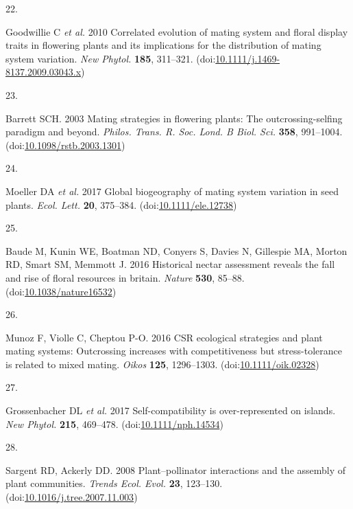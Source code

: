 \documentclass[
  12pt,
  a4paper,
]{article}
\newlength{\cslhangindent}
\newlength{\csllabelwidth}
\newlength{\cslentryspacingunit} %
\newenvironment{CSLReferences}[2] %
 {%
  \setlength{\parindent}{0pt}
  \ifodd #1
  \let\oldpar\par
  \def\par{\hangindent=\cslhangindent\oldpar}
  \fi
  \setlength{\parskip}{#2\cslentryspacingunit}
 }%
 {}
\newcommand{\CSLLeftMargin}[1]{\parbox[t]{\csllabelwidth}{#1}}
\newcommand{\CSLRightInline}[1]{\parbox[t]{\linewidth - \csllabelwidth}{#1}\break}
\begin{document}
\begin{CSLReferences}{0}{0}
\leavevmode{}%
\CSLLeftMargin{22. }
\CSLRightInline{Goodwillie C \emph{et al.} 2010 Correlated evolution of mating system and floral display traits in flowering plants and its implications for the distribution of mating system variation. \emph{New Phytol.} \textbf{185}, 311--321. (doi:\href{https://doi.org/10.1111/j.1469-8137.2009.03043.x}{10.1111/j.1469-8137.2009.03043.x})}

\leavevmode{}%
\CSLLeftMargin{23. }
\CSLRightInline{Barrett SCH. 2003 Mating strategies in flowering plants: The outcrossing-selfing paradigm and beyond. \emph{Philos. Trans. R. Soc. Lond. B Biol. Sci.} \textbf{358}, 991--1004. (doi:\href{https://doi.org/10.1098/rstb.2003.1301}{10.1098/rstb.2003.1301})}

\leavevmode{}%
\CSLLeftMargin{24. }
\CSLRightInline{Moeller DA \emph{et al.} 2017 Global biogeography of mating system variation in seed plants. \emph{Ecol. Lett.} \textbf{20}, 375--384. (doi:\href{https://doi.org/10.1111/ele.12738}{10.1111/ele.12738})}

\leavevmode{}%
\CSLLeftMargin{25. }
\CSLRightInline{Baude M, Kunin WE, Boatman ND, Conyers S, Davies N, Gillespie MA, Morton RD, Smart SM, Memmott J. 2016 Historical nectar assessment reveals the fall and rise of floral resources in britain. \emph{Nature} \textbf{530}, 85--88. (doi:\href{https://doi.org/10.1038/nature16532}{10.1038/nature16532})}

\leavevmode{}%
\CSLLeftMargin{26. }
\CSLRightInline{Munoz F, Violle C, Cheptou P-O. 2016 {CSR} ecological strategies and plant mating systems: Outcrossing increases with competitiveness but stress-tolerance is related to mixed mating. \emph{Oikos} \textbf{125}, 1296--1303. (doi:\href{https://doi.org/10.1111/oik.02328}{10.1111/oik.02328})}

\leavevmode{}%
\CSLLeftMargin{27. }
\CSLRightInline{Grossenbacher DL \emph{et al.} 2017 Self-compatibility is over-represented on islands. \emph{New Phytol.} \textbf{215}, 469--478. (doi:\href{https://doi.org/10.1111/nph.14534}{10.1111/nph.14534})}

\leavevmode{}%
\CSLLeftMargin{28. }
\CSLRightInline{Sargent RD, Ackerly DD. 2008 Plant--pollinator interactions and the assembly of plant communities. \emph{Trends Ecol. Evol.} \textbf{23}, 123--130. (doi:\href{https://doi.org/10.1016/j.tree.2007.11.003}{10.1016/j.tree.2007.11.003})}


\end{CSLReferences}
\end{document}
